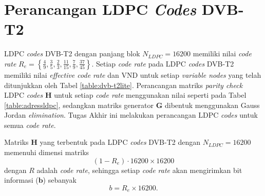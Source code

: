 \section{Perancangan LDPC \textit{Codes} DVB-T2}
LDPC \textit{codes} DVB-T2 dengan panjang blok $N_{LDPC}=16200$ memiliki nilai \textit{code rate} $R_e=\left \{ \frac{4}{9}, \frac{3}{5}, \frac{2}{3}, \frac{11}{15}, \frac{7}{9}, \frac{37}{45} \right \}$. Setiap \textit{code rate} pada LDPC \textit{codes} DVB-T2 memiliki nilai \textit{effective code rate} dan VND untuk setiap \textit{variable nodes} yang telah ditunjukkan oleh Tabel \ref{table:dvb-t2lite}. Perancangan matriks \textit{parity check} LDPC \textit{codes} $\mathbf{H}$ untuk setiap \textit{code rate} menggunakan nilai seperti pada Tabel \ref{table:adressldpc}, sedangkan matriks generator $\mathbf{G}$ dibentuk menggunakan Gauss Jordan \textit{elimination}. Tugas Akhir ini melakukan perancangan LDPC \textit{codes} untuk semua \textit{code rate}. 

Matriks $\mathbf{H}$ yang terbentuk pada LDPC \textit{codes} DVB-T2 dengan $N_{LDPC}=16200$ memenuhi dimensi matriks
\begin{equation}
	(1-R_e) \cdot 16200 \times 16200
\end{equation}
dengan $R$ adalah \textit{code rate}, sehingga setiap \textit{code rate} akan mengirimkan bit informasi ($\mathbf{b}$) sebanyak 
\begin{equation}
	b = R_e \times 16200.
\end{equation}

